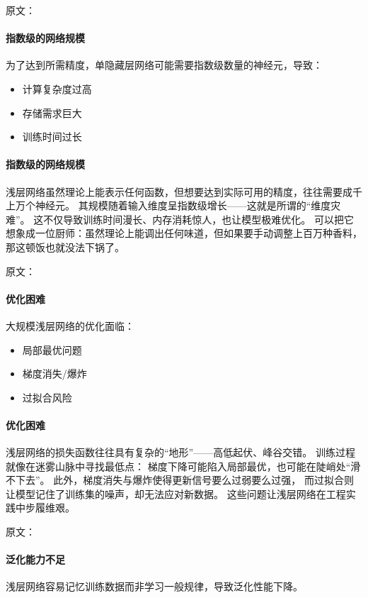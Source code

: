 原文：
\paragraph{指数级的网络规模}
为了达到所需精度，单隐藏层网络可能需要指数级数量的神经元，导致：
\begin{itemize}
\item 计算复杂度过高
\item 存储需求巨大
\item 训练时间过长
\end{itemize}
\paragraph{指数级的网络规模}  
浅层网络虽然理论上能表示任何函数，但想要达到实际可用的精度，往往需要成千上万个神经元。  
其规模随着输入维度呈指数级增长——这就是所谓的“维度灾难”。  
这不仅导致训练时间漫长、内存消耗惊人，也让模型极难优化。  
可以把它想象成一位厨师：虽然理论上能调出任何味道，但如果要手动调整上百万种香料，  
那这顿饭也就没法下锅了。

原文：
\paragraph{优化困难}
大规模浅层网络的优化面临：
\begin{itemize}
\item 局部最优问题
\item 梯度消失/爆炸
\item 过拟合风险
\end{itemize}
\paragraph{优化困难}  
浅层网络的损失函数往往具有复杂的“地形”——高低起伏、峰谷交错。  
训练过程就像在迷雾山脉中寻找最低点：  
梯度下降可能陷入局部最优，也可能在陡峭处“滑不下去”。  
此外，梯度消失与爆炸使得更新信号要么过弱要么过强，  
而过拟合则让模型记住了训练集的噪声，却无法应对新数据。  
这些问题让浅层网络在工程实践中步履维艰。

原文：
\paragraph{泛化能力不足}
浅层网络容易记忆训练数据而非学习一般规律，导致泛化性能下降。
